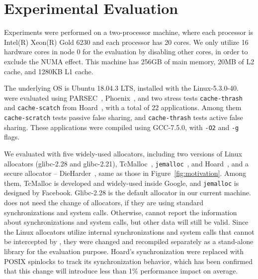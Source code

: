 \section{Experimental Evaluation}
\label{sec:evaluation}

Experiments were performed on a two-processor machine, where each processor is Intel(R) Xeon(R) Gold 6230 and each processor has 20 cores. We only utilize 16 hardware cores in node 0 for the evaluation by disabling other cores, in order to exclude the NUMA effect. This machine has 256GB of main memory, 20MB of L2 cache, and 1280KB L1 cache. 

The underlying OS is Ubuntu 18.04.3 LTS, installed with the Linux-5.3.0-40. \MP{} were evaluated using PARSEC~\cite{parsec},  Phoenix~\cite{phoenix}, and two stress tests \texttt{cache-thrash} and \texttt{cache-scatch} from Hoard~\cite{Hoard}, with a total of 22 applications. Among them \texttt{cache-scratch} tests passive false sharing, and \texttt{cache-thrash} tests active false sharing. These applications were compiled using GCC-7.5.0, with \texttt{-O2} and \texttt{-g} flags. 

We evaluated \MP{} with five widely-used allocators, including two versions of Linux allocators (glibc-2.28 and glibc-2.21), TcMalloc~\cite{tcmalloc}, \texttt{jemalloc}~\cite{jemalloc},  and Hoard~\cite{Hoard}, and  a secure allocator -- DieHarder~\cite{DieHarder}, same as those in Figure~\ref{fig:motivation}. Among them, TcMalloc is developed and widely-used inside Google, and \texttt{jemalloc} is designed by Facebook. Glibc-2.28 is the default allocator in our current machine. \MP{} does not need the change of allocators, if they are using standard synchronizations and system calls. Otherwise, \MP{} cannot report the information about synchronizations and system calls, but other data will still be valid. Since the Linux allocators utilize internal synchronizations and system calls that cannot be intercepted by \MP{}, they were changed and recompiled separately as a stand-alone library for the evaluation purpose. Hoard's synchronization were replaced with POSIX spinlocks to track its synchronization behavior, which has been confirmed that this change will introduce less than 1\% performance impact on average.  


